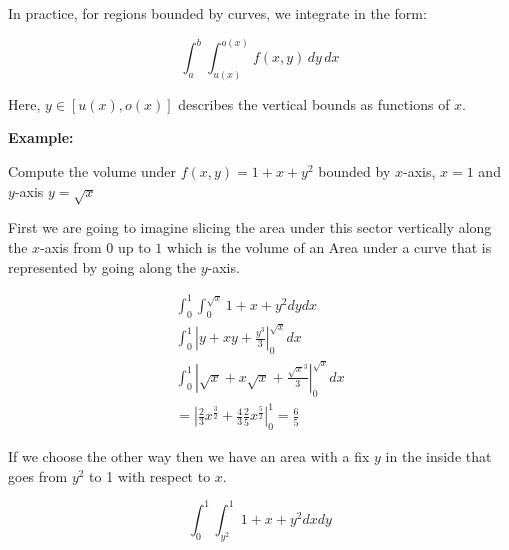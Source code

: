 In practice, for regions bounded by curves, we integrate in the form:

\[
    \int_a^b \int_{u(x)}^{o(x)} f(x, y)\, dy\, dx
\]

Here, \( y \in [u(x), o(x)] \) describes the vertical bounds as functions of \(x\).

\textbf{Example:}

Compute the volume under \(f(x,y) = 1 + x + y^2\) bounded by \(x\)-axis, \(x = 1\) and \(y\)-axis 
\(y = \sqrt{x}\)

\begin{center}
\end{center}

First we are going to imagine slicing the area under this sector vertically along the \(x\)-axis from 
\(0\) up to \(1\) which is the volume of an Area under a curve that is represented by going along the 
\(y\)-axis.

\begin{align*}
    \int_{0}^{1}\int_{0}^{\sqrt{x}} 1 + x + y^2 dy dx \\
    \int_{0}^{1} \left| y + xy + \frac{y^3}{3} \right|_{0}^{\sqrt{x}} dx \\
    \int_{0}^{1} \left| \sqrt{x} + x\sqrt{x} + \frac{\sqrt{x}^3}{3} \right|_{0}^{\sqrt{x}} dx \\
    = \left| \frac{2}{3} x^{\frac{3}{2}} + \frac{4}{3} \frac{2}{5} x^{\frac{5}{2}} \right|_{0}^{1} = \frac{6}{5}
\end{align*}

If we choose the other way then we have an area with a fix \(y\) in the inside that goes from \(y^2\) to 
1 with respect to \(x\).

\[
    \int_{0}^{1}\int_{y^2}^{1} 1 + x + y^2 dx dy
\]

